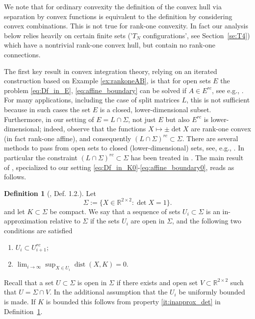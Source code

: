 \documentclass[titlepage]{amsart}
\numberwithin{equation}{section}
\theoremstyle{plain}
\theoremstyle{definition}
\newtheorem{definition}[equation]{Definition}
\theoremstyle{remark}
\newcommand{\ben}{\begin{enumerate}}
\newcommand{\dist}{\operatorname{dist}}
\newcommand{\een}{\end{enumerate}}
\newcommand{\R}{\mathbb{R}}
\begin{document}
We note that for ordinary convexity the definition of the convex hull via separation by convex
functions is equivalent to the definition by considering convex combinations. 
This is not true for rank-one convexity. In fact our analysis below relies heavily on certain
finite sets ('$T_N$ configurations', see Section~\ref{se:T4}) which have a nontrivial rank-one convex hull, 
but contain no rank-one connections.

The first key result in convex integration theory, relying on an iterated construction based on Example \ref{ex:rankoneAB}, is that for open sets $E$ the problem 
 \eqref{eq:Df_in_E},  \eqref{eq:affine_boundary} can be solved if $A \in E^{rc}$, see e.g., 
 \cite[Thm. 3.1]{muller_sverak03}. For many applications, including the case of split matrices $L$, this is not sufficient because in such cases the set $E$ is a closed, lower-dimensional subset. Furthermore, in our setting of $E=L\cap\Sigma$, not just $E$ but also $E^{rc}$ is lower-dimensional; indeed, observe that the functions $X\mapsto \pm\det X$ are rank-one convex (in fact rank-one affine), and consequently $(L\cap\Sigma)^{rc}\subset\Sigma$.   There are several methods to pass from open sets to closed (lower-dimensional) sets, see, e.g., 
 \cite{muller_sverak96, dacorogna_marcellini99, sychev01, kirchheim03, muller_sverak03} . In particular the constraint $(L\cap\Sigma)^{rc}\subset\Sigma$ has been treated in \cite{muller_sverak_constraint}. The main result of \cite{muller_sverak_constraint}, specialized to our setting \eqref{eq:Df_in_K0}-\eqref{eq:affine_boundary0}, reads as follows.
  

\begin{definition}[\cite{muller_sverak_constraint}, Def. 1.2.] \label{de:in_approx_constraint}
 Let 
\begin{equation}\label{eq:set_constraint}
 \Sigma := \{ X \in \R^{2 \times 2} : \det X = 1 \}.
 \end{equation}
and let $K \subset \Sigma$ be compact.
We say that a sequence of sets $U_i \subset \Sigma$ is an in-approximation relative to $\Sigma$  if the sets
$U_i$  are open in $\Sigma$, and the following two conditions are satisfied
\ben
\item $U_i \subset U_{i+1}^{rc}$; 
\item  \label{it:inapprox_det}  $\lim_{i \to \infty} \sup_{X \in U_i} \dist(X, K) = 0$.
\een
\end{definition}

Recall that a set $U \subset \Sigma$ is open in $\Sigma$ if there exists and open set $V \subset \R^{2 \times 2}$ such that
$U = \Sigma \cap V$. In \cite[Def. 1.2]{muller_sverak_constraint} the additional assumption that the $U_i$ be uniformly bounded is made. 
If $K$ is bounded this follows from property   \eqref{it:inapprox_det} in Definition~\ref{de:in_approx_constraint}.
\end{document}
